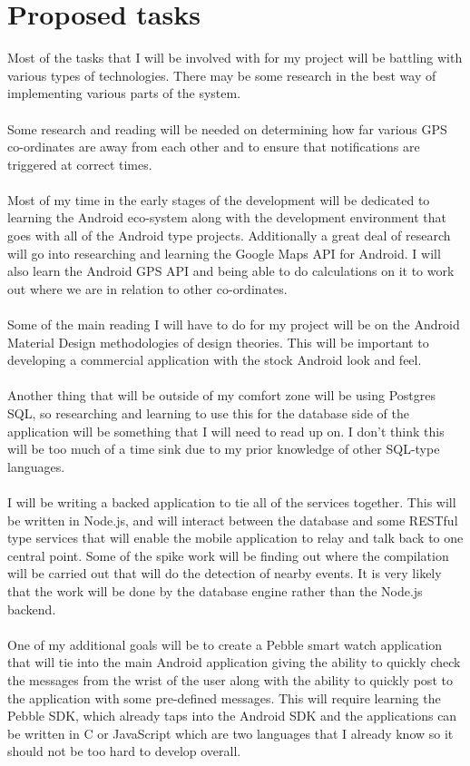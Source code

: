\documentclass[11pt,fleqn,twoside]{article}
\begin{document}
\section{Proposed tasks}

Most of the tasks that I will be involved with for my project will be battling with various types of technologies. There may be some research in the best way of implementing various parts of the system.\\
\\
Some research and reading will be needed on determining how far various GPS co-ordinates are away from each other and to ensure that notifications are triggered at correct times.\\
\\
Most of my time in the early stages of the development will be dedicated to learning the Android eco-system along with the development environment that goes with all of the Android type projects. Additionally a great deal of research will go into researching and learning the Google Maps API for Android. I will also learn the Android GPS API and being able to do calculations on it to work out where we are in relation to other co-ordinates.\\
\\
Some of the main reading I will have to do for my project will be on the Android Material Design methodologies of design theories. This will be important to developing a commercial application with the stock Android look and feel.\\
\\
Another thing that will be outside of my comfort zone will be using Postgres SQL, so researching and learning to use this for the database side of the application will be something that I will need to read up on. I don't think this will be too much of a time sink due to my prior knowledge of other SQL-type languages.\\
\\
I will be writing a backed application to tie all of the services together. This will be written in Node.js, and will interact between the database and some RESTful type services that will enable the mobile application to relay and talk back to one central point. Some of the spike work will be finding out where the compilation will be carried out that will do the detection of nearby events. It is very likely that the work will be done by the database engine rather than the Node.js backend.\\
\\ 
One of my additional goals will be to create a Pebble smart watch application that will tie into the main Android application giving the ability to quickly check the messages from the wrist of the user along with the ability to quickly post to the application with some pre-defined messages. This will require learning the Pebble SDK, which already taps into the Android SDK and the applications can be written in C or JavaScript which are two languages that I already know so it should not be too hard to develop overall.
\end{document}
